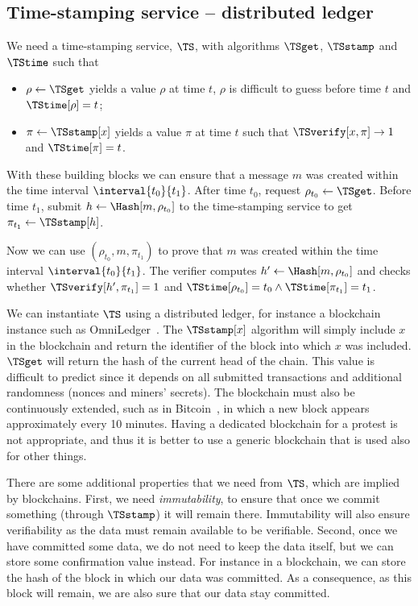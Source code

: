 \subsection{Time-stamping service -- distributed ledger}%
\label{StorageProperties}


We need a time-stamping service, \(\TS\), with algorithms \(\TSget\), \(\TSstamp\) and \(\TStime\) such that
\begin{itemize}
  \item \(\rho \gets \TSget\) yields a value \(\rho\) at time \(t\), \(\rho\) is difficult to guess before time \(t\) and \(\TStime[\rho] = t\);
  \item \(\pi\gets \TSstamp[x]\) yields a value \(\pi\) at time \(t\) such that \(\TSverify[x, \pi]\to 1\) and \(\TStime[\pi] = t\).
\end{itemize}

With these building blocks we can ensure that a message \(m\) was created within the time interval \(\interval{t_0}{t_1}\).
After time \(t_0\), request \(\rho_{t_0}\gets \TSget\).
Before time \(t_1\), submit \(h\gets \Hash[m, \rho_{t_0}]\) to the time-stamping service to get \(\pi_{t_1}\gets \TSstamp[h]\).

Now we can use \((\rho_{t_0}, m, \pi_{t_1})\) to prove that \(m\) was created within the time interval \(\interval{t_0}{t_1}\).
The verifier computes \(h'\gets \Hash[m, \rho_{t_0}]\) and checks whether \(\TSverify[h', \pi_{t_1}] = 1\) and \(\TStime[\rho_{t_0}] = t_0\land \TStime[\pi_{t_1}] = t_1\).

We can instantiate \(\TS\) using a distributed ledger, for instance a blockchain instance such as OmniLedger~\cite{OmniLedger}.
The \(\TSstamp[x]\) algorithm will simply include \(x\) in the blockchain and return the identifier of the block into which \(x\) was included.
\(\TSget\) will return the hash of the current head of the chain.
This value is difficult to predict since it depends on all submitted transactions and additional randomness (\eg nonces and miners' secrets).
The blockchain must also be continuously extended, such as in Bitcoin~\cite{Bitcoin}, in which a new block appears approximately every 10 minutes.
Having a dedicated blockchain for a protest is not appropriate, and thus it is better to use a generic blockchain that is used also for other things.

There are some additional properties that we need from \(\TS\), which are implied by blockchains.
First, we need \emph{immutability}, to ensure that once we commit something (through \(\TSstamp\)) it will remain there.
Immutability will also ensure verifiability as the data must remain available to be verifiable.
Second, once we have committed some data, we do not need to keep the data itself, but we can store some confirmation value instead.
For instance in a blockchain, we can store the hash of the block in which our data was committed.
As a consequence, as this block will remain, we are also sure that our data stay committed.

